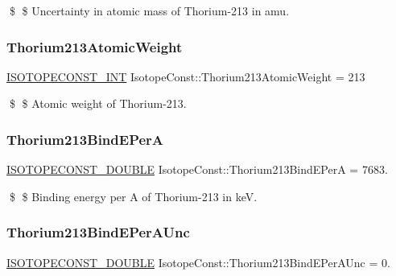 \$ \$ Uncertainty in atomic mass of Thorium-\/213 in amu. \mbox{\label{group___isotope_const-_thorium-_th213_ga19166a19101c25d1cf33da73f1acfa7d}} 
\subsubsection{\texorpdfstring{Thorium213\+Atomic\+Weight}{Thorium213AtomicWeight}}
{\footnotesize\ttfamily \mbox{\hyperlink{group___isotope_const-_macros_ga5f18360b3e99483a35c32d789e62621c}{I\+S\+O\+T\+O\+P\+E\+C\+O\+N\+S\+T\+\_\+\+I\+NT}} Isotope\+Const\+::\+Thorium213\+Atomic\+Weight = 213}

\$ \$ Atomic weight of Thorium-\/213. \mbox{\label{group___isotope_const-_thorium-_th213_gaeaa1aa1d7cdd4f8bfcfdc75231313203}} 
\subsubsection{\texorpdfstring{Thorium213\+Bind\+E\+PerA}{Thorium213BindEPerA}}
{\footnotesize\ttfamily \mbox{\hyperlink{group___isotope_const-_macros_ga8f45a7272ce02c0b4c65c44636ed719a}{I\+S\+O\+T\+O\+P\+E\+C\+O\+N\+S\+T\+\_\+\+D\+O\+U\+B\+LE}} Isotope\+Const\+::\+Thorium213\+Bind\+E\+PerA = 7683.}

\$ \$ Binding energy per A of Thorium-\/213 in keV. \mbox{\label{group___isotope_const-_thorium-_th213_ga477fe510fdc2708ddc607a046253e51b}} 
\subsubsection{\texorpdfstring{Thorium213\+Bind\+E\+Per\+A\+Unc}{Thorium213BindEPerAUnc}}
{\footnotesize\ttfamily \mbox{\hyperlink{group___isotope_const-_macros_ga8f45a7272ce02c0b4c65c44636ed719a}{I\+S\+O\+T\+O\+P\+E\+C\+O\+N\+S\+T\+\_\+\+D\+O\+U\+B\+LE}} Isotope\+Const\+::\+Thorium213\+Bind\+E\+Per\+A\+Unc = 0.}

